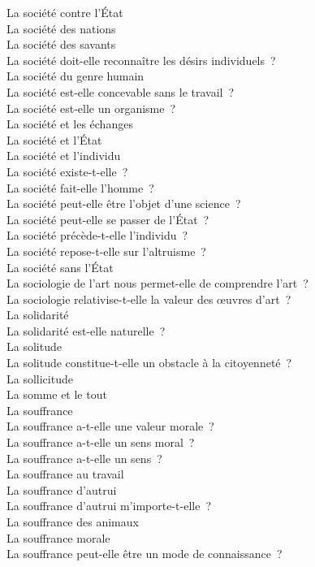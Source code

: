 \documentclass[a4paper,12pt]{article}
\begin{document}
La société contre l'État \\
La société des nations \\
La société des savants \\
La société doit-elle reconnaître les désirs individuels ? \\
La société du genre humain \\
La société est-elle concevable sans le travail ? \\
La société est-elle un organisme ? \\
La société et les échanges \\
La société et l'État \\
La société et l'individu \\
La société existe-t-elle ? \\
La société fait-elle l'homme ? \\
La société peut-elle être l'objet d'une science ? \\
La société peut-elle se passer de l'État ? \\
La société précède-t-elle l'individu ? \\
La société repose-t-elle sur l'altruisme ? \\
La société sans l'État \\
La sociologie de l'art nous permet-elle de comprendre l'art ? \\
La sociologie relativise-t-elle la valeur des œuvres d'art ? \\
La solidarité \\
La solidarité est-elle naturelle ? \\
La solitude \\
La solitude constitue-t-elle un obstacle à la citoyenneté ? \\
La sollicitude \\
La somme et le tout \\
La souffrance \\
La souffrance a-t-elle une valeur morale ? \\
La souffrance a-t-elle un sens moral ? \\
La souffrance a-t-elle un sens ? \\
La souffrance au travail \\
La souffrance d'autrui \\
La souffrance d'autrui m'importe-t-elle ? \\
La souffrance des animaux \\
La souffrance morale \\
La souffrance peut-elle être un mode de connaissance ? \\
\end{document}
